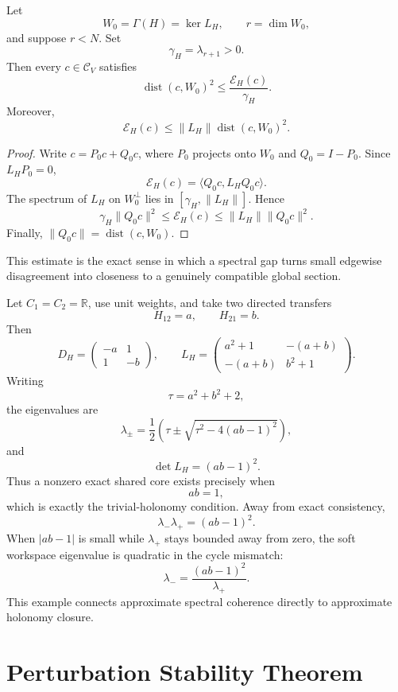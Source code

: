 \begin{SRWTtheorem}\label{SRWT:thm:poincare-workspace}
Let
\[
W_0=\Gamma(H)=\ker L_H,
\qquad
r=\dim W_0,
\]
and suppose \(r<N\). Set
\[
\gamma_H=\lambda_{r+1}>0.
\]
Then every \(c\in\mathcal C_V\) satisfies
\[
\boxed{
\operatorname{dist}(c,W_0)^2
\leq
\frac{\mathcal E_H(c)}{\gamma_H}.
}
\]
Moreover,
\[
\mathcal E_H(c)
\leq
\|L_H\|\operatorname{dist}(c,W_0)^2.
\]
\end{SRWTtheorem}

\begin{proof}
Write \(c=P_0c+Q_0c\), where \(P_0\) projects onto \(W_0\) and
\(Q_0=I-P_0\). Since \(L_HP_0=0\),
\[
\mathcal E_H(c)
=
\langle Q_0c,L_HQ_0c\rangle.
\]
The spectrum of \(L_H\) on \(W_0^\perp\) lies in
\([\gamma_H,\|L_H\|]\). Hence
\[
\gamma_H\|Q_0c\|^2
\leq
\mathcal E_H(c)
\leq
\|L_H\|\|Q_0c\|^2.
\]
Finally, \(\|Q_0c\|=\operatorname{dist}(c,W_0)\).
\end{proof}

This estimate is the exact sense in which a spectral gap turns small edgewise
disagreement into closeness to a genuinely compatible global section.


Let \(C_1=C_2=\mathbb R\), use unit weights, and take two directed transfers
\[
H_{12}=a,
\qquad
H_{21}=b.
\]
Then
\[
D_H
=
\begin{pmatrix}
-a&1\\
1&-b
\end{pmatrix},
\qquad
L_H
=
\begin{pmatrix}
a^2+1&-(a+b)\\
-(a+b)&b^2+1
\end{pmatrix}.
\]
Writing
\[
\tau=a^2+b^2+2,
\]
the eigenvalues are
\[
\lambda_\pm
=
\frac{1}{2}
\left(
\tau\pm\sqrt{\tau^2-4(ab-1)^2}
\right),
\]
and
\[
\det L_H=(ab-1)^2.
\]
Thus a nonzero exact shared core exists precisely when
\[
ab=1,
\]
which is exactly the trivial-holonomy condition. Away from exact consistency,
\[
\lambda_-\lambda_+=(ab-1)^2.
\]
When \(|ab-1|\) is small while \(\lambda_+\) stays bounded away from zero, the
soft workspace eigenvalue is quadratic in the cycle mismatch:
\[
\lambda_-
=
\frac{(ab-1)^2}{\lambda_+}.
\]
This example connects approximate spectral coherence directly to approximate
holonomy closure.

\section{Perturbation Stability Theorem}

